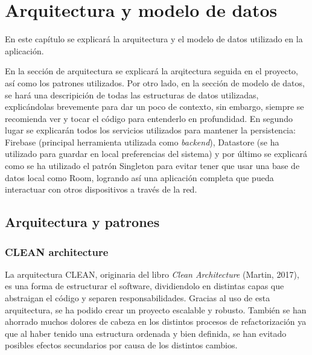\chapter{Arquitectura y modelo de datos}
\label{cap:modeloDeDatos}
En este capítulo se explicará la arquitectura y el modelo de datos utilizado en la aplicación. 

En la sección de arquitectura se explicará la arqitectura seguida en el proyecto, así como los patrones utilizados. Por otro lado, en la sección de modelo de datos, se hará una descripición de todas las estructuras de datos utilizadas, explicándolas brevemente para dar un poco de contexto, sin embargo, siempre se recomienda ver y tocar el código para entenderlo en profundidad. En segundo lugar se explicarán todos los servicios utilizados para mantener la persistencia: Firebase (principal herramienta utilizada como \textit{backend}), Datastore (se ha utilizado para guardar en local preferencias del sistema) y por último se explicará como se ha utilizado el patrón Singleton para evitar tener que usar una base de datos local como 
Room\hyperlink{cap:biblio}{}, logrando así una aplicación completa que pueda interactuar con otros dispositivos a través de la red.
\section{Arquitectura y patrones}
\subsection{CLEAN architecture}
\label{subsec:cleanArch}
La arquitectura CLEAN, originaria del libro \textit{Clean Architecture} (Martin, 2017)\hyperlink{cap:biblio}{}, es una forma de estructurar el software, dividiendolo en distintas capas que abstraigan el código y separen responsabilidades. Gracias al uso de esta arquitectura, se ha podido crear un proyecto escalable y robusto. También se han ahorrado muchos dolores de cabeza en los distintos procesos de refactorización ya que al haber tenido una estructura ordenada y bien definida, se han evitado posibles efectos secundarios por causa de los distintos cambios.

